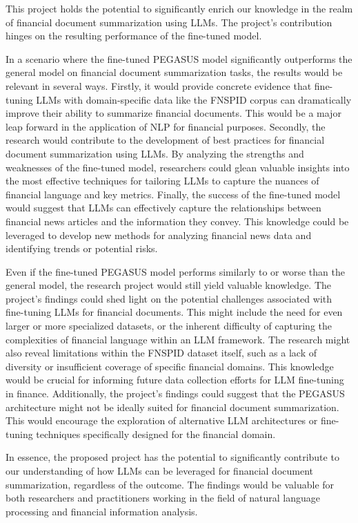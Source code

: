 This project holds the potential to significantly enrich our knowledge in the realm of financial document summarization
using LLMs. The project's contribution hinges on the resulting performance of the fine-tuned model.

In a scenario where the fine-tuned PEGASUS model significantly outperforms the general model on financial document
summarization tasks, the results would be relevant in several ways.
Firstly, it would provide concrete evidence that fine-tuning LLMs with domain-specific data like the FNSPID corpus can
dramatically improve their ability to summarize financial documents.
This would be a major leap forward in the application of NLP for financial purposes.
Secondly, the research would contribute to the development of best practices for financial document summarization using
LLMs.
By analyzing the strengths and weaknesses of the fine-tuned model, researchers could glean valuable insights into the
most effective techniques for tailoring LLMs to capture the nuances of financial language and key metrics.
Finally, the success of the fine-tuned model would suggest that LLMs can effectively capture the relationships between
financial news articles and the information they convey.
This knowledge could be leveraged to develop new methods for analyzing financial news data and identifying trends or
potential risks.

Even if the fine-tuned PEGASUS model performs similarly to or worse than the general model, the research project would
still yield valuable knowledge.
The project's findings could shed light on the potential challenges associated with fine-tuning LLMs for financial
documents.
This might include the need for even larger or more specialized datasets, or the inherent difficulty of capturing the
complexities of financial language within an LLM framework.
The research might also reveal limitations within the FNSPID dataset itself, such as a lack of diversity or insufficient
coverage of specific financial domains.
This knowledge would be crucial for informing future data collection efforts for LLM fine-tuning in finance.
Additionally, the project's findings could suggest that the PEGASUS architecture might not be ideally suited for financial
document summarization.
This would encourage the exploration of alternative LLM architectures or fine-tuning techniques specifically designed for
the financial domain.

In essence, the proposed project has the potential to significantly contribute to our understanding of how LLMs can be
leveraged for financial document summarization, regardless of the outcome.
The findings would be valuable for both researchers and practitioners working in the field of natural language processing
and financial information analysis.
